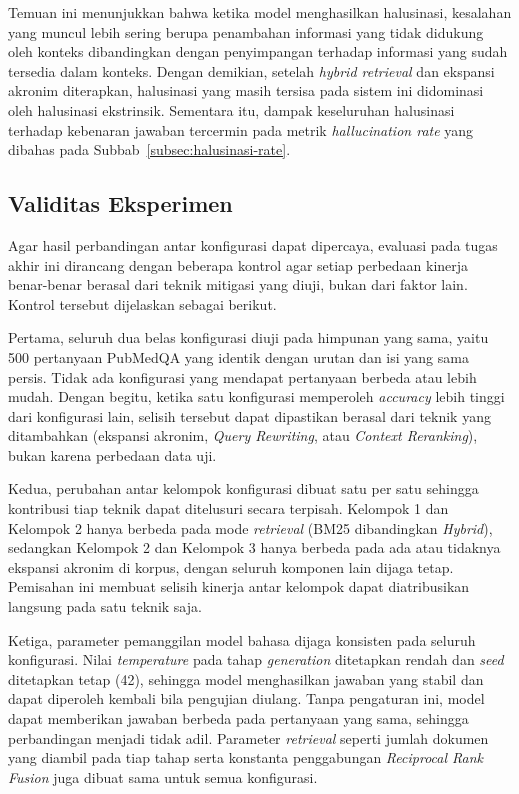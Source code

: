 Temuan ini menunjukkan bahwa ketika model menghasilkan halusinasi, kesalahan yang muncul lebih sering berupa penambahan informasi yang tidak didukung oleh konteks dibandingkan dengan penyimpangan terhadap informasi yang sudah tersedia dalam konteks. Dengan demikian, setelah \textit{hybrid retrieval} dan ekspansi akronim diterapkan, halusinasi yang masih tersisa pada sistem ini didominasi oleh halusinasi ekstrinsik. Sementara itu, dampak keseluruhan halusinasi terhadap kebenaran jawaban tercermin pada metrik \textit{hallucination rate} yang dibahas pada Subbab~\ref{subsec:halusinasi-rate}.

\subsection{Validitas Eksperimen}
\label{subsec:validitas-eksperimen}

Agar hasil perbandingan antar konfigurasi dapat dipercaya, evaluasi pada tugas akhir ini dirancang dengan beberapa kontrol agar setiap perbedaan kinerja benar-benar berasal dari teknik mitigasi yang diuji, bukan dari faktor lain. Kontrol tersebut dijelaskan sebagai berikut.

Pertama, seluruh dua belas konfigurasi diuji pada himpunan yang sama, yaitu 500 pertanyaan PubMedQA yang identik dengan urutan dan isi yang sama persis. Tidak ada konfigurasi yang mendapat pertanyaan berbeda atau lebih mudah. Dengan begitu, ketika satu konfigurasi memperoleh \textit{accuracy} lebih tinggi dari konfigurasi lain, selisih tersebut dapat dipastikan berasal dari teknik yang ditambahkan (ekspansi akronim, \textit{Query Rewriting}, atau \textit{Context Reranking}), bukan karena perbedaan data uji.

Kedua, perubahan antar kelompok konfigurasi dibuat satu per satu sehingga kontribusi tiap teknik dapat ditelusuri secara terpisah. Kelompok 1 dan Kelompok 2 hanya berbeda pada mode \textit{retrieval} (BM25 dibandingkan \textit{Hybrid}), sedangkan Kelompok 2 dan Kelompok 3 hanya berbeda pada ada atau tidaknya ekspansi akronim di korpus, dengan seluruh komponen lain dijaga tetap. Pemisahan ini membuat selisih kinerja antar kelompok dapat diatribusikan langsung pada satu teknik saja.

Ketiga, parameter pemanggilan model bahasa dijaga konsisten pada seluruh konfigurasi. Nilai \textit{temperature} pada tahap \textit{generation} ditetapkan rendah dan \textit{seed} ditetapkan tetap (42), sehingga model menghasilkan jawaban yang stabil dan dapat diperoleh kembali bila pengujian diulang. Tanpa pengaturan ini, model dapat memberikan jawaban berbeda pada pertanyaan yang sama, sehingga perbandingan menjadi tidak adil. Parameter \textit{retrieval} seperti jumlah dokumen yang diambil pada tiap tahap serta konstanta penggabungan \textit{Reciprocal Rank Fusion} juga dibuat sama untuk semua konfigurasi.

